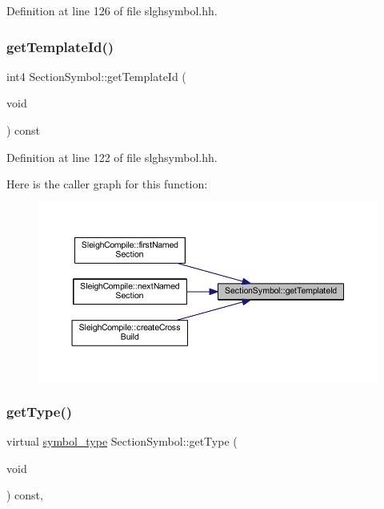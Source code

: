 Definition at line 126 of file slghsymbol.\+hh.

\mbox{\label{class_section_symbol_ad0bc8150af50f0cc022d60b276b5d177}} 
\subsubsection{\texorpdfstring{getTemplateId()}{getTemplateId()}}
{\footnotesize\ttfamily int4 Section\+Symbol\+::get\+Template\+Id (\begin{DoxyParamCaption}\item[{void}]{ }\end{DoxyParamCaption}) const\hspace{0.3cm}{\ttfamily [inline]}}



Definition at line 122 of file slghsymbol.\+hh.

Here is the caller graph for this function\+:
\nopagebreak
\begin{figure}[H]
\begin{center}
\leavevmode
\includegraphics[width=350pt]{class_section_symbol_ad0bc8150af50f0cc022d60b276b5d177_icgraph}
\end{center}
\end{figure}
\mbox{\label{class_section_symbol_a936ccdd0a97a5ca046d97cf66fbb4c83}} 
\subsubsection{\texorpdfstring{getType()}{getType()}}
{\footnotesize\ttfamily virtual \mbox{\hyperlink{class_sleigh_symbol_aba70f7f332fd63488c5ec4bd7807db41}{symbol\+\_\+type}} Section\+Symbol\+::get\+Type (\begin{DoxyParamCaption}\item[{void}]{ }\end{DoxyParamCaption}) const\hspace{0.3cm}{\ttfamily [inline]}, {\ttfamily [virtual]}}



